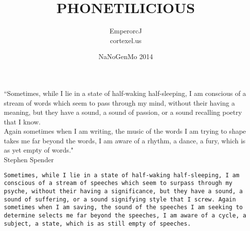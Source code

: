 \documentclass[12pt,a4paper,oneside]{book}
\title{PHONETILICIOUS}
\author{EmperorcJ \\cortexel.us}
\date{NaNoGenMo 2014 }
\begin{document}
\frontmatter

\maketitle

\clearpage
\vspace*{\fill}
\begin{center}
\begin{minipage}{.85\textwidth}

\raggedright

``Sometimes, while I lie in a state of half-waking half-sleeping, I am conscious of a stream of words which seem to pass through my mind, without their having a meaning, but they have a sound, a sound of passion, or a sound recalling poetry that I know. \linebreak \\ 

Again sometimes when I am writing, the music of the words I am trying to shape takes me far beyond the words, I am aware of a rhythm, a dance, a fury, which is as yet empty of words."\linebreak \\ 

Stephen Spender 
\end{minipage}
\end{center}

\vfill
\clearpage

\vspace*{\fill}
\begin{center}
\begin{minipage}{.85\textwidth}
\raggedright
\texttt{Sometimes, while I lie in a state of half-waking half-sleeping, I am conscious of a stream of speeches which seem to surpass through my psyche, without their having a significance, but they have a sound, a sound of suffering, or a sound signifying style that I screw. \linebreak \linebreak
Again sometimes when I am saving, the sound of the speeches I am seeking to determine selects me far beyond the speeches, I am aware of a cycle, a subject, a state, which is as still empty of speeches.\linebreak \linebreak}

\end{minipage}
\end{center}
\clearpage
\end{document}

